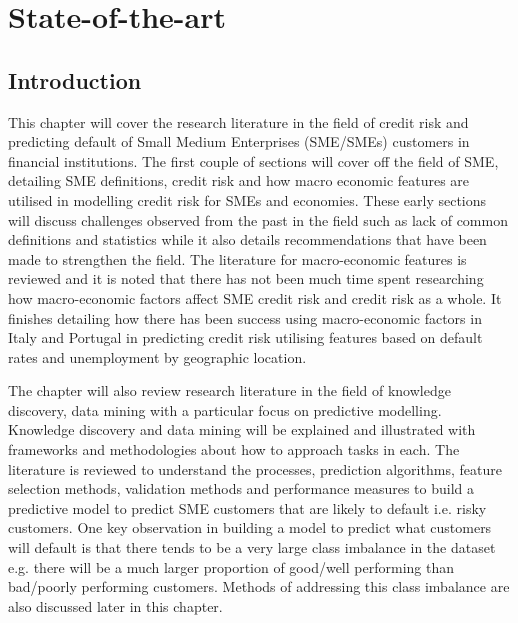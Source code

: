 
\chapter{State-of-the-art} %

\label{Chapter2} %


\section{Introduction}

This chapter will cover the research literature in the field of credit risk and predicting default of Small Medium Enterprises (SME/SMEs) customers in financial institutions. The first couple of sections will cover off the field of SME, detailing SME definitions, credit risk and how macro economic features are utilised in modelling credit risk for SMEs and economies. These early sections will discuss challenges observed from the past in the field such as lack of common definitions and statistics while it also details recommendations that have been made to strengthen the field. The literature for macro-economic features is reviewed and it is noted that there has not been much time spent researching how macro-economic factors affect SME credit risk and credit risk as a whole. It finishes detailing how there has been success using macro-economic factors in Italy and Portugal in predicting credit risk utilising features based on default rates and unemployment by geographic location.   

The chapter will also review research literature in the field of knowledge discovery, data mining with a particular focus on predictive modelling. Knowledge discovery and data mining will be explained and illustrated with frameworks and methodologies about how to approach tasks in each. The literature is reviewed to understand the processes, prediction algorithms, feature selection methods, validation methods and performance measures to build a predictive model to predict SME customers that are likely to default i.e. risky customers. One key observation in building a model to predict what customers will default is that there tends to be a very large class imbalance in the dataset e.g. there will be a much larger proportion of good/well performing than bad/poorly performing customers. Methods of addressing this class imbalance are also discussed later in this chapter.

